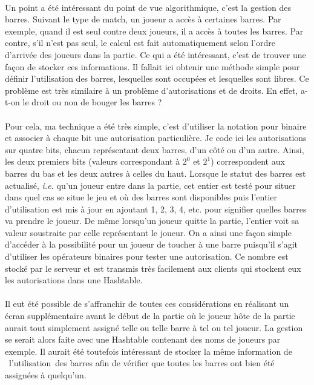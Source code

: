 \documentclass[a4paper,12pt]{report}
\begin{document}
\paragraph{}
Un point a été intéressant du point de vue algorithmique, c'est la gestion des barres. Suivant le type de match, un joueur a accès à certaines barres. Par exemple, quand il est seul contre deux joueurs, il a accès à toutes les barres. Par contre, s'il n'est pas seul, le calcul est fait automatiquement selon l'ordre d'arrivée des joueurs dans la partie. Ce qui a été intéressant, c'est de trouver une façon de stocker ces informations. Il fallait ici obtenir une méthode simple pour définir \og l'utilisation \fg des barres, lesquelles sont occupées et lesquelles sont libres. Ce problème est très similaire à un problème d'autorisations et de droits. En effet, a-t-on le droit ou non de bouger les barres ?
\paragraph{}
Pour cela, ma technique a été très simple, c'est d'utiliser la notation pour binaire et associer à chaque bit une autorisation particulière. Je code ici les autorisations sur quatre bits, chacun représentant deux barres, d'un côté ou d'un autre. Ainsi, les deux premiers bits (valeurs correspondant à \(2^0\) et \(2^1\)) correspondent aux barres du bas et les deux autres à celles du haut. Lorsque le statut des barres est actualisé, \emph{i.e. } qu'un joueur entre dans la partie, cet entier est testé pour situer dans quel cas se situe le jeu et où des barres sont disponibles puis l'entier d'utilisation est mis à jour en ajoutant 1, 2, 3, 4, etc. pour signifier quelles barres va prendre le joueur. De même lorsqu'un joueur quitte la partie, l'entier voit sa valeur soustraite par celle représentant le joueur. On a ainsi une façon simple d'accéder à la possibilité pour un joueur de toucher à une barre puisqu'il s'agit d'utiliser les opérateurs binaires pour tester une autorisation. Ce nombre est stocké par le serveur et est transmis très facilement aux clients qui stockent eux les autorisations dans une Hashtable.
\paragraph{}
Il eut été possible de s'affranchir de toutes ces considérations en réalisant un écran supplémentaire avant le début de la partie où le joueur hôte de la partie aurait tout simplement assigné telle ou telle barre à tel ou tel joueur. La gestion se serait alors faite avec une Hashtable contenant des noms de joueurs par exemple. Il aurait été toutefois intéressant de stocker la même information de \og l'utilisation \fg  des barres afin de vérifier que toutes les barres ont bien été assignées à quelqu'un.
\end{document}
